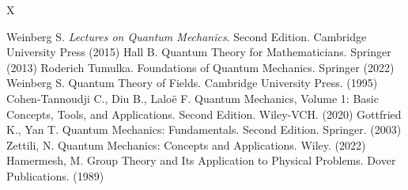 \cleardoublepage
{}
\begin{thebibliography}{X}

    
	 Weinberg S. \emph{Lectures on Quantum Mechanics}. Second Edition. Cambridge University Press (2015)
	 Hall B. Quantum Theory for Mathematicians. Springer (2013)
	 Roderich Tumulka. Foundations of Quantum Mechanics. Springer (2022)
	 Weinberg S. Quantum Theory of Fields. Cambridge University Press. (1995)
	 Cohen-Tannoudji C., Diu B., Laloë F. Quantum Mechanics, Volume 1: Basic Concepts, Tools, and Applications. Second Edition. Wiley-VCH. (2020)
	 Gottfried K., Yan T. Quantum Mechanics: Fundamentals. Second Edition. Springer. (2003)
	 Zettili, N. Quantum Mechanics: Concepts and Applications. Wiley. (2022)
	Hamermesh, M. Group Theory and Its Application to Physical Problems. Dover Publications. (1989)

\end{thebibliography}
